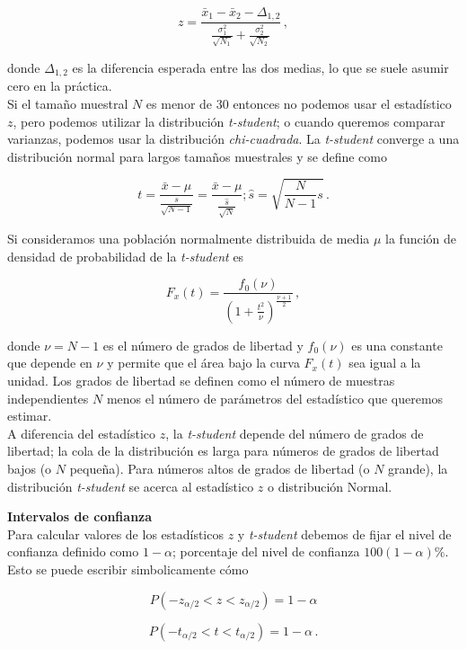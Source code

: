 \documentclass[
]{agujournal2019}
\begin{document}
\[z=\frac{\bar{x}_1-\bar{x}_2-\Delta_{1,2}}
  {\frac{\sigma_1^2}{\sqrt{N_1}} + \frac{\sigma_2^2}{\sqrt{N_2}}}\,,\]

donde \(\Delta_{1,2}\) es la diferencia esperada entre las dos medias,
lo que se suele asumir cero en la práctica.\\

Si el tamaño muestral \(N\) es menor de \(30\) entonces no podemos usar
el estadístico \(z\), pero podemos utilizar la distribución
\emph{t-student}; o cuando queremos comparar varianzas, podemos usar la
distribución \emph{chi-cuadrada}. La \emph{t-student} converge a una
distribución normal para largos tamaños muestrales y se define como

\[t=\frac{\bar{x}-\mu}{\frac{s}{\sqrt{N-1}}}=\frac{\bar{x}-\mu}{\frac{\hat{s}}{\sqrt{N}}};
\hat{s}=\sqrt{\frac{N}{N-1}s}\,.\]

Si consideramos una población normalmente distribuida de media \(\mu\)
la función de densidad de probabilidad de la \emph{t-student} es

\[F_{x}(t)=\frac{f_0(\nu)}{\left(1+\frac{t^2}{\nu} \right)^{\frac{\nu+1}{2}}}\,,\]

donde \(\nu=N-1\) es el número de grados de libertad y \(f_0(\nu)\) es
una constante que depende en \(\nu\) y permite que el área bajo la curva
\(F_x(t)\) sea igual a la unidad. Los grados de libertad se definen como
el número de muestras independientes \(N\) menos el número de parámetros
del estadístico que queremos estimar.\\

A diferencia del estadístico \(z\), la \emph{t-student} depende del
número de grados de libertad; la cola de la distribución es larga para
números de grados de libertad bajos (o \(N\) pequeña). Para números
altos de grados de libertad (o \(N\) grande), la distribución
\emph{t-student} se acerca al estadístico \(z\) o distribución Normal.

\vspace{0.5cm}

\textbf{Intervalos de confianza}\\

Para calcular valores de los estadísticos \(z\) y \emph{t-student}
debemos de fijar el nivel de confianza definido como \(1-\alpha\);
porcentaje del nivel de confianza \(100(1-\alpha)\%\). Esto se puede
escribir simbolicamente cómo

\[P(-z_{\alpha/2}<z<z_{\alpha/2})=1-\alpha\]

\[P(-t_{\alpha/2}<t<t_{\alpha/2})=1-\alpha\,.\]
\end{document}
